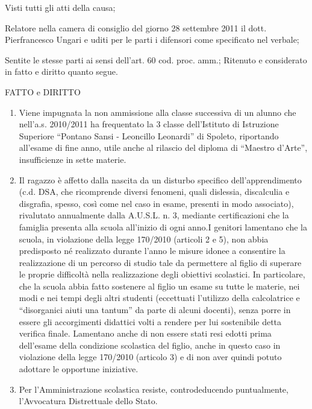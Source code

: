 Visti tutti gli atti della causa;

Relatore nella camera di consiglio del giorno 28 settembre 2011 il dott. Pierfrancesco Ungari e uditi per le parti i difensori come specificato nel verbale;

Sentite le stesse parti ai sensi dell’art. 60 cod. proc. amm.;
Ritenuto e considerato in fatto e diritto quanto segue.
\begin{center}
	FATTO e DIRITTO
\end{center}
\begin{enumerate}
	\item Viene impugnata la non ammissione alla classe successiva di un alunno che nell'a.s. 2010/2011 ha frequentato la 3 classe dell'Istituto di Istruzione Superiore “Pontano Sansi - Leoncillo Leonardi” di Spoleto, riportando all'esame di fine anno, utile anche al rilascio del diploma di “Maestro d'Arte”, insufficienze in sette materie.
	\item Il ragazzo è affetto dalla nascita da un disturbo specifico dell'apprendimento (c.d. DSA, che ricomprende diversi fenomeni, quali dislessia, discalculia e disgrafia, spesso, così come nel caso in esame, presenti in modo associato), rivalutato annualmente dalla A.U.S.L. n. 3, mediante certificazioni che la famiglia presenta alla scuola all'inizio di ogni anno.I genitori lamentano che la scuola, in violazione della legge 170/2010 (articoli 2 e 5), non abbia predisposto né realizzato durante l'anno le misure idonee a consentire la realizzazione di un percorso di studio tale da permettere al figlio di superare le proprie difficoltà nella realizzazione degli obiettivi scolastici. In particolare, che la scuola abbia fatto sostenere al figlio un esame su tutte le materie, nei modi e nei tempi degli altri studenti (eccettuati l'utilizzo della calcolatrice e “disorganici aiuti una tantum” da parte di alcuni docenti), senza porre in essere gli accorgimenti didattici volti a rendere per lui sostenibile detta verifica finale.
	Lamentano anche di non essere stati resi edotti prima dell'esame della condizione scolastica del figlio, anche in questo caso in violazione della legge 170/2010 (articolo 3) e di non aver quindi potuto adottare le opportune iniziative.
	\item Per l'Amministrazione scolastica resiste, controdeducendo puntualmente, l'Avvocatura Distrettuale dello Stato.

\end{enumerate}
